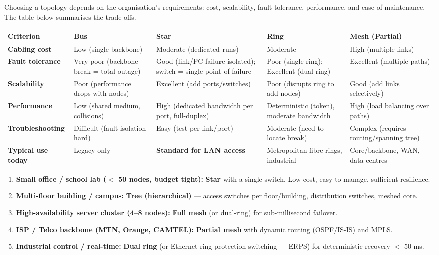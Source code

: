 \documentclass[11pt]{article}
\begin{document}
Choosing a topology depends on the organisation's requirements: cost, scalability, fault tolerance, performance, and ease of maintenance. The table below summarises the trade-offs.

\begin{center}
\begin{tabularx}{\linewidth}{|l|X|X|X|X|}\hline
\rowcolor{popblueL}
\textbf{Criterion} & \textbf{Bus} & \textbf{Star} & \textbf{Ring} & \textbf{Mesh (Partial)} \\\hline
\textbf{Cabling cost} & Low (single backbone) & Moderate (dedicated runs) & Moderate & High (multiple links) \\\hline
\textbf{Fault tolerance} & Very poor (backbone break = total outage) & Good (link/PC failure isolated); switch = single point of failure & Poor (single ring); Excellent (dual ring) & Excellent (multiple paths) \\\hline
\textbf{Scalability} & Poor (performance drops with nodes) & Excellent (add ports/switches) & Poor (disrupts ring to add nodes) & Good (add links selectively) \\\hline
\textbf{Performance} & Low (shared medium, collisions) & High (dedicated bandwidth per port, full-duplex) & Deterministic (token), moderate bandwidth & High (load balancing over paths) \\\hline
\textbf{Troubleshooting} & Difficult (fault isolation hard) & Easy (test per link/port) & Moderate (need to locate break) & Complex (requires routing/spanning tree) \\\hline
\textbf{Typical use today} & Legacy only & \textbf{Standard for LAN access} & Metropolitan fibre rings, industrial & Core/backbone, WAN, data centres \\\hline
\end{tabularx}
\end{center}

\begin{methode}
\begin{enumerate}
\item \textbf{Small office / school lab ($<$ 50 nodes, budget tight):} \textbf{Star} with a single switch. Low cost, easy to manage, sufficient resilience.
\item \textbf{Multi-floor building / campus:} \textbf{Tree (hierarchical)} — access switches per floor/building, distribution switches, meshed core.
\item \textbf{High-availability server cluster (4–8 nodes):} \textbf{Full mesh} (or dual-ring) for sub-millisecond failover.
\item \textbf{ISP / Telco backbone (MTN, Orange, CAMTEL):} \textbf{Partial mesh} with dynamic routing (OSPF/IS-IS) and MPLS.
\item \textbf{Industrial control / real-time:} \textbf{Dual ring} (or Ethernet ring protection switching — ERPS) for deterministic recovery $<$ 50 ms.
\end{enumerate}
\end{methode}
\end{document}
